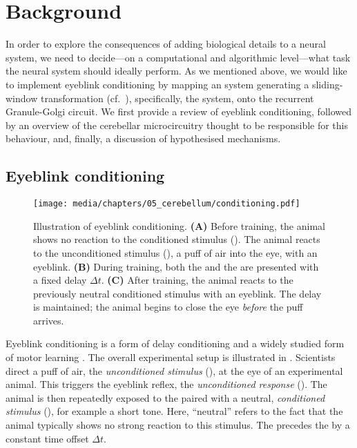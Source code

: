 
\section{Background}

In order to explore the consequences of adding biological details to a neural system, we need to decide---on a computational and algorithmic level---what task the neural system should ideally perform.
As we mentioned above, we would like to implement eyeblink conditioning by mapping an \LTI system generating a sliding-window transformation (cf.~), specifically, the \LDN system, onto the recurrent Granule-Golgi circuit.
We first provide a review of eyeblink conditioning, followed by an overview of the cerebellar microcircuitry thought to be responsible for this behaviour, and, finally, a discussion of hypothesised mechanisms.

\subsection{Eyeblink conditioning}

\begin{figure}
	\texttt{[image: media/chapters/05\_cerebellum/conditioning.pdf]}
	\caption[Illustration of eyeblink conditioning]{
	Illustration of eyeblink conditioning.
	\textbf{(A)} Before training, the animal shows no reaction to the conditioned stimulus (\CS).
	The animal reacts to the unconditioned stimulus (\US), a puff of air into the eye, with an eyeblink.
	\textbf{(B)} During training, both the \CS and the \US are presented with a fixed delay $\Delta t$.
	\textbf{(C)} After training, the animal reacts to the previously neutral conditioned stimulus with an eyeblink. The delay is maintained; the animal begins to close the eye \emph{before} the puff arrives.
	}
	\label{fig:conditioning}
\end{figure}

Eyeblink conditioning is a form of delay conditioning and a widely studied form of motor learning \citep[e.g.,][Chapter~42, pp.~975-979]{kandel2012principles}.
The overall experimental setup is illustrated in .
Scientists direct a puff of air, the \emph{unconditioned stimulus} (\US), at the eye of an experimental animal.
This triggers the eyeblink reflex, the \emph{unconditioned response} (\UR).
The animal is then repeatedly exposed to the \US paired with a neutral, \emph{conditioned stimulus} (\CS), for example a short tone.
Here, \enquote{neutral} refers to the fact that the animal typically shows no strong reaction to this stimulus.
The \CS precedes the \US by a constant time offset $\Delta t$.


